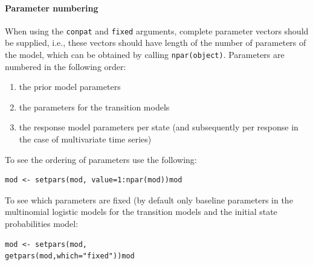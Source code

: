 \documentclass[a4paper]{article}
\newcommand{\code}{\texttt}
\begin{document}
\paragraph{Parameter numbering} When using the \code{conpat} and
\code{fixed} arguments, complete parameter vectors should be supplied,
i.e., these vectors should have length of the number of parameters of
the model, which can be obtained by calling \code{npar(object)}.
Parameters are numbered in the following order:
\begin{enumerate}
	\item  the prior model parameters

	\item  the parameters for the transition models
	
	\item  the response model parameters per state (and subsequently
	per response in the case of multivariate time series)

\end{enumerate}

To see the ordering of parameters use the following:
\begin{verbatim}
mod <- setpars(mod, value=1:npar(mod))mod
\end{verbatim}

To see which parameters are fixed (by default only baseline parameters
in the multinomial logistic models for the transition models and the
initial state probabilities model:
\begin{verbatim}
mod <- setpars(mod,
getpars(mod,which="fixed"))mod
\end{verbatim}


\end{document}
